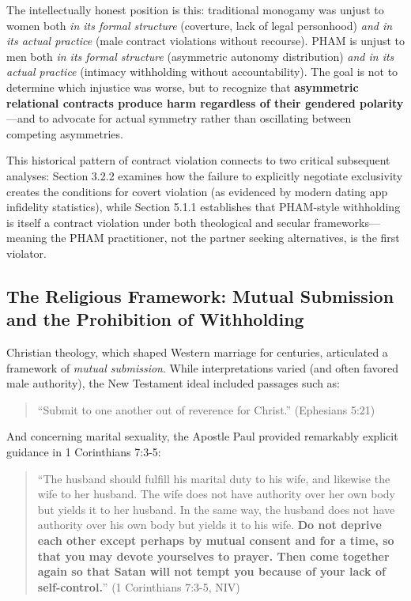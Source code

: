 \documentclass[12pt,openany]{book}
\numberwithin{equation}{chapter}
\begin{document}
The intellectually honest position is this: traditional monogamy was unjust to women both \textit{in its formal structure} (coverture, lack of legal personhood) \textit{and in its actual practice} (male contract violations without recourse). PHAM is unjust to men both \textit{in its formal structure} (asymmetric autonomy distribution) \textit{and in its actual practice} (intimacy withholding without accountability). The goal is not to determine which injustice was worse, but to recognize that \textbf{asymmetric relational contracts produce harm regardless of their gendered polarity}---and to advocate for actual symmetry rather than oscillating between competing asymmetries.

This historical pattern of contract violation connects to two critical subsequent analyses: Section 3.2.2 examines how the failure to explicitly negotiate exclusivity creates the conditions for covert violation (as evidenced by modern dating app infidelity statistics), while Section 5.1.1 establishes that PHAM-style withholding is itself a contract violation under both theological and secular frameworks---meaning the PHAM practitioner, not the partner seeking alternatives, is the first violator.

\subsection{The Religious Framework: Mutual Submission and the Prohibition of Withholding}

Christian theology, which shaped Western marriage for centuries, articulated a framework of \textit{mutual submission}. While interpretations varied (and often favored male authority), the New Testament ideal included passages such as:

\begin{quote}
    ``Submit to one another out of reverence for Christ.'' (Ephesians 5:21)
\end{quote}

And concerning marital sexuality, the Apostle Paul provided remarkably explicit guidance in 1 Corinthians 7:3-5:

\begin{quote}
    ``The husband should fulfill his marital duty to his wife, and likewise the wife to her husband. The wife does not have authority over her own body but yields it to her husband. In the same way, the husband does not have authority over his own body but yields it to his wife. \textbf{Do not deprive each other except perhaps by mutual consent and for a time, so that you may devote yourselves to prayer. Then come together again so that Satan will not tempt you because of your lack of self-control.}'' (1 Corinthians 7:3-5, NIV)
\end{quote}
\end{document}
